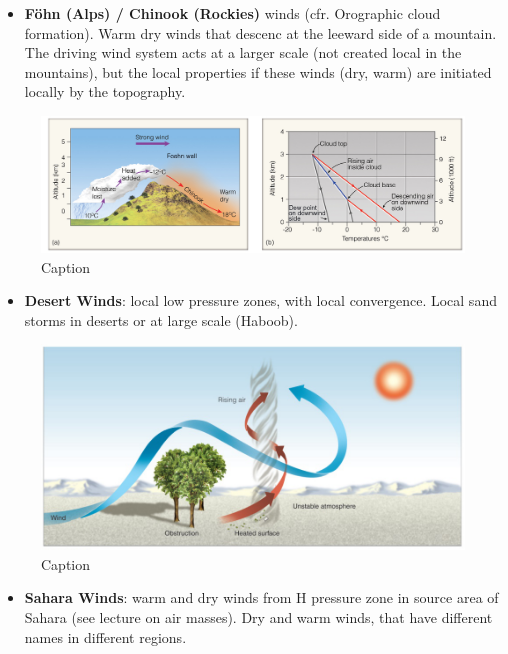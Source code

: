 \documentclass[oneside]{book}
\providecommand{\tightlist}{%
  \setlength{\itemsep}{0pt}\setlength{\parskip}{0pt}}
\begin{document}
\begin{itemize}
\tightlist
\item
  \textbf{Föhn (Alps) / Chinook (Rockies)} winds (cfr. Orographic cloud
  formation). Warm dry winds that descenc at the leeward side of a
  mountain. The driving wind system acts at a larger scale (not created
  local in the mountains), but the local properties if these winds (dry,
  warm) are initiated locally by the topography.
\end{itemize}

\begin{figure}

{\centering \includegraphics[width=0.6\linewidth]{figures/Figure428} 

}

\caption{Caption}\label{fig:Fohn}
\end{figure}

\begin{itemize}
\tightlist
\item
  \textbf{Desert Winds}: local low pressure zones, with local
  convergence. Local sand storms in deserts or at large scale (Haboob).
\end{itemize}

\begin{figure}

{\centering \includegraphics[width=0.6\linewidth]{figures/Figure429} 

}

\caption{Caption}\label{fig:DesertW}
\end{figure}

\begin{itemize}
\tightlist
\item
  \textbf{Sahara Winds}: warm and dry winds from H pressure zone in
  source area of Sahara (see lecture on air masses). Dry and warm winds,
  that have different names in different regions.
\end{itemize}
\end{document}
